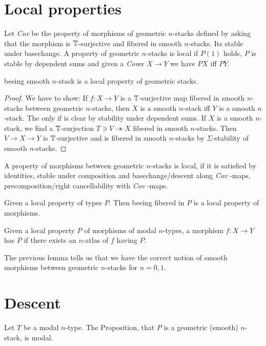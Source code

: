 \documentclass{article}
\newcommand{\Cov}{\emph{Cov} }
\newcommand{\Cover}{\emph{Cov}er }
\begin{document}
\section{Local properties}

\begin{definition}
Let \Cov be the property of morphisms of geometric $n$-stacks defined by asking that the morphism is $\mathbb{T}$-surjective and fibered in smooth $n$-stacks. Its stable under basechange. A property of geometric $n$-stacks is local if $P(1)$ holds, $P$ is stable by dependent sums and given a \Cover  $X \to Y$ we have $P X$ iff $P Y$.
\end{definition}
\begin{example}    
    beeing smooth $n$-stack is a local property of geometric stacks.
\end{example}
\begin{proof}
    We have to show: If $f : X \to Y$ is a $\mathbb{T}$-surjective map fibered in smooth $n$-stacks between geometric $n$-stacks, then $X$ is a smooth $n$-stack iff $Y$ is a smooth $n$-stack.
    The only if is clear by stability under dependent sums.
    If $X$ is a smooth $n$-stack, we find a $\mathbb{T}$-surjection $T \ni V \twoheadrightarrow X$ fibered in smooth $n$-stacks. Then $V \to X \to Y$ is $\mathbb{T}$-surjective and is fibered in smooth $n$-stacks by $\Sigma$-stability of smooth $n$-stacks.
\end{proof}

\begin{definition}
    A property of morphisms between geometric $n$-stacks is local, if it is satisfied by identities, stable under composition and basechange/descent along \Cov-maps, precomposition/right cancellability with \Cov-maps.
\end{definition}
\begin{lemma}
    Given a local property of types $P$. Then beeing fibered in $P$ is a local property of morphisms.
\end{lemma}
\begin{lemma}
    Given a local property $P$ of morphisms of modal $n$-types, a morphism $f : X \to Y$ has $P$ if there exists an $n$-atlas of $f$ having $P$.
\end{lemma}
The previous lemma tells us that we have the correct notion of smooth morphisms between geometric $n$-stacks for $n = 0,1$.
\section{Descent}
 \begin{theorem}{\label{thm:descent}}
     Let $T$ be a modal $n$-type. The Proposition, that $P$ is a geometric (smooth) $n$-stack, is modal.
 \end{theorem}
\end{document}
